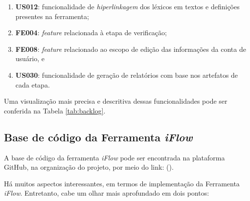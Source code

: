 \begin{enumerate}
    \item \textbf{US012}: funcionalidade de \textit{hiperlinkagem} dos léxicos em textos e definições presentes na ferramenta;
    \item \textbf{FE004}: \textit{feature} relacionada à etapa de verificação;
    \item \textbf{FE008}: \textit{feature} relacionado ao escopo de edição das informações da conta de usuário, e
    \item \textbf{US030}: funcionalidade de geração de relatórios com base nos artefatos de cada etapa.
\end{enumerate}

Uma visualização mais precisa e descritiva dessas funcionalidades pode ser conferida na Tabela \ref{tab:backlog}.

\subsection{Base de código da Ferramenta \textit{iFlow}}

A base de código da ferramenta \textit{iFlow} pode ser encontrada na plataforma GitHub, na organização do projeto, por meio do link:  (\citeyear{github_iFlow}).

Há muitos aspectos interessantes, em termos de implementação da Ferramenta \textit{iFlow}. Entretanto, cabe um olhar mais aprofundado  em dois pontos:

